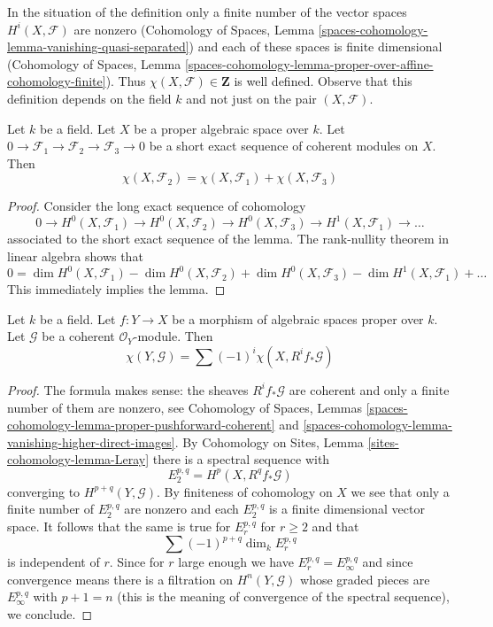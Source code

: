 \noindent
In the situation of the definition only a finite number of the vector spaces
$H^i(X, \mathcal{F})$ are nonzero (Cohomology of Spaces, Lemma
\ref{spaces-cohomology-lemma-vanishing-quasi-separated})
and each of these spaces is finite dimensional
(Cohomology of Spaces, Lemma
\ref{spaces-cohomology-lemma-proper-over-affine-cohomology-finite}). Thus
$\chi(X, \mathcal{F}) \in \mathbf{Z}$ is well defined. Observe that
this definition depends on the field $k$ and not just on the pair
$(X, \mathcal{F})$.

\begin{lemma}
\label{lemma-euler-characteristic-additive}
Let $k$ be a field. Let $X$ be a proper algebraic space over $k$.
Let $0 \to \mathcal{F}_1 \to \mathcal{F}_2 \to \mathcal{F}_3 \to 0$
be a short exact sequence of coherent modules on $X$. Then
$$
\chi(X, \mathcal{F}_2) = \chi(X, \mathcal{F}_1) + \chi(X, \mathcal{F}_3)
$$
\end{lemma}

\begin{proof}
Consider the long exact sequence of cohomology
$$
0 \to H^0(X, \mathcal{F}_1) \to H^0(X, \mathcal{F}_2) \to
H^0(X, \mathcal{F}_3) \to H^1(X, \mathcal{F}_1) \to \ldots
$$
associated to the short exact sequence of the lemma. The rank-nullity theorem
in linear algebra shows that
$$
0 = \dim H^0(X, \mathcal{F}_1) - \dim H^0(X, \mathcal{F}_2)
+ \dim H^0(X, \mathcal{F}_3) - \dim H^1(X, \mathcal{F}_1) + \ldots
$$
This immediately implies the lemma.
\end{proof}

\begin{lemma}
\label{lemma-euler-characteristic-morphism}
Let $k$ be a field. Let $f : Y \to X$ be a morphism of
algebraic spaces proper over $k$. Let $\mathcal{G}$ be a
coherent $\mathcal{O}_Y$-module. Then
$$
\chi(Y, \mathcal{G}) = \sum (-1)^i \chi(X, R^if_*\mathcal{G})
$$
\end{lemma}

\begin{proof}
The formula makes sense: the sheaves $R^if_*\mathcal{G}$ are coherent
and only a finite number of them are nonzero, see
Cohomology of Spaces, Lemmas
\ref{spaces-cohomology-lemma-proper-pushforward-coherent} and
\ref{spaces-cohomology-lemma-vanishing-higher-direct-images}.
By Cohomology on Sites, Lemma \ref{sites-cohomology-lemma-Leray}
there is a spectral sequence with
$$
E_2^{p, q} = H^p(X, R^qf_*\mathcal{G})
$$
converging to $H^{p + q}(Y, \mathcal{G})$. By finiteness of cohomology
on $X$ we see that only a finite number of $E_2^{p, q}$ are nonzero
and each $E_2^{p, q}$ is a finite dimensional vector space. It follows
that the same is true for $E_r^{p, q}$ for $r \geq 2$ and that
$$
\sum (-1)^{p + q} \dim_k E_r^{p, q}
$$
is independent of $r$. Since for $r$ large enough we have
$E_r^{p, q} = E_\infty^{p, q}$ and since convergence means there
is a filtration on $H^n(Y, \mathcal{G})$ whose graded pieces are
$E_\infty^{p, q}$ with $p + 1 = n$ (this is the meaning of convergence
of the spectral sequence), we conclude.
\end{proof}








